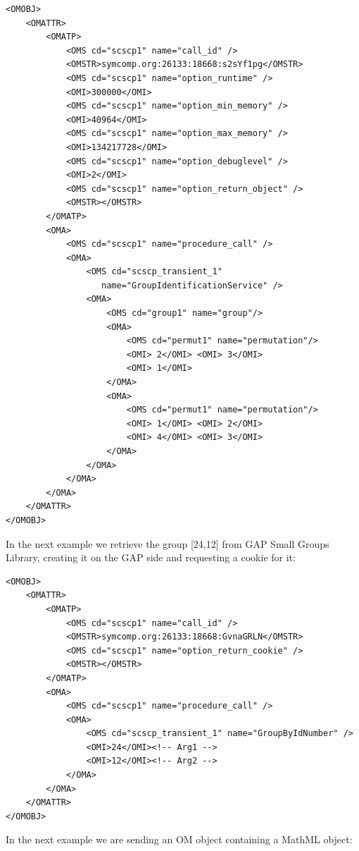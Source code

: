 \documentclass{amsart}
\begin{document}
\begin{verbatim}
<OMOBJ>
    <OMATTR>
        <OMATP>
            <OMS cd="scscp1" name="call_id" />
            <OMSTR>symcomp.org:26133:18668:s2sYf1pg</OMSTR>
            <OMS cd="scscp1" name="option_runtime" />
            <OMI>300000</OMI>
            <OMS cd="scscp1" name="option_min_memory" />
            <OMI>40964</OMI>
            <OMS cd="scscp1" name="option_max_memory" />
            <OMI>134217728</OMI>
            <OMS cd="scscp1" name="option_debuglevel" />
            <OMI>2</OMI>
            <OMS cd="scscp1" name="option_return_object" />
            <OMSTR></OMSTR>
        </OMATP>
        <OMA>
            <OMS cd="scscp1" name="procedure_call" />
            <OMA>
                <OMS cd="scscp_transient_1" 
                   name="GroupIdentificationService" />
                <OMA>
                    <OMS cd="group1" name="group"/>
                    <OMA>
                        <OMS cd="permut1" name="permutation"/>
                        <OMI> 2</OMI> <OMI> 3</OMI>
                        <OMI> 1</OMI>
                    </OMA>
                    <OMA>
                        <OMS cd="permut1" name="permutation"/>
                        <OMI> 1</OMI> <OMI> 2</OMI>
                        <OMI> 4</OMI> <OMI> 3</OMI>
                    </OMA>
                </OMA>        
            </OMA>
        </OMA>
    </OMATTR>
</OMOBJ>

\end{verbatim}

In the next example we retrieve the group [24,12] from GAP Small Groups Library,
creating it on the GAP side and requesting a cookie for it:

\begin{verbatim}
<OMOBJ>
    <OMATTR>
        <OMATP>
            <OMS cd="scscp1" name="call_id" />
            <OMSTR>symcomp.org:26133:18668:GvnaGRLN</OMSTR>
            <OMS cd="scscp1" name="option_return_cookie" />
            <OMSTR></OMSTR>
        </OMATP>
        <OMA>
            <OMS cd="scscp1" name="procedure_call" />
            <OMA>
                <OMS cd="scscp_transient_1" name="GroupByIdNumber" />
                <OMI>24</OMI><!-- Arg1 -->
                <OMI>12</OMI><!-- Arg2 -->
            </OMA>    
        </OMA>
    </OMATTR>
</OMOBJ>
\end{verbatim}

In the next example we are sending an OM object containing a MathML object:
\end{document}
